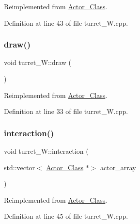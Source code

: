 Reimplemented from \hyperlink{class_actor___class_a9447c6154a674d7e6bdf24ff2874b7a8}{Actor\+\_\+\+Class}.



Definition at line 43 of file turret\+\_\+\+W.\+cpp.

\hypertarget{classturret___w_a9dce201a49a87d2a9e03c9efea6361e8}{}\label{classturret___w_a9dce201a49a87d2a9e03c9efea6361e8} 
\subsubsection{\texorpdfstring{draw()}{draw()}}
{\footnotesize\ttfamily void turret\+\_\+\+W\+::draw (\begin{DoxyParamCaption}{ }\end{DoxyParamCaption})\hspace{0.3cm}{\ttfamily [virtual]}}



Reimplemented from \hyperlink{class_actor___class_ac49cd62be76b4b950ecbe155413f1b64}{Actor\+\_\+\+Class}.



Definition at line 33 of file turret\+\_\+\+W.\+cpp.

\hypertarget{classturret___w_a3b071bffcc2d407b88d4eca47e4820e0}{}\label{classturret___w_a3b071bffcc2d407b88d4eca47e4820e0} 
\subsubsection{\texorpdfstring{interaction()}{interaction()}}
{\footnotesize\ttfamily void turret\+\_\+\+W\+::interaction (\begin{DoxyParamCaption}\item[{std\+::vector$<$ \hyperlink{class_actor___class}{Actor\+\_\+\+Class} $\ast$$>$}]{actor\+\_\+array }\end{DoxyParamCaption})\hspace{0.3cm}{\ttfamily [virtual]}}



Reimplemented from \hyperlink{class_actor___class_a87d1e079d8576fa99592a60b38a04a1b}{Actor\+\_\+\+Class}.



Definition at line 45 of file turret\+\_\+\+W.\+cpp.

\hypertarget{classturret___w_af467ddd08bd7304716f5a336321b2ca5}{}\label{classturret___w_af467ddd08bd7304716f5a336321b2ca5} 
